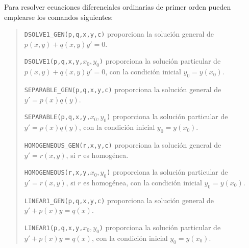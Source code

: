 \begin{indicacion}
{ Para resolver ecuaciones diferenciales ordinarias de primer orden
 pueden emplearse los
comandos siguientes:
\begin{quote}
\texttt{DSOLVE1\_GEN(p,q,x,y,c)} proporciona la solución general de $p(x,y)+q(x,y)y'=0$.

\texttt{DSOLVE1(p,q,x,y,$x_{0},y_{0}$)} proporciona la solución particular de $p(x,y)+q(x,y)y'=0$, con la condición inicial $y_{0}=y(x_{0})$.

\texttt{SEPARABLE\_GEN(p,q,x,y,c)} proporciona la solución general de $y'=p(x)q(y)$.

\texttt{SEPARABLE(p,q,x,y,$x_{0},y_{0}$)} proporciona la solución particular de $y'=p(x)q(y)$, con la condición inicial $y_{0}=y(x_{0})$.

\texttt{HOMOGENEOUS\_GEN(r,x,y,c)} proporciona la solución general de $y'=r(x,y)$, si $r$ es homogénea.

\texttt{HOMOGENEOUS(r,x,y,$x_{0},y_{0}$)} proporciona la solución particular de $y'=r(x,y)$, si $r$ es homogénea, con la condición inicial $y_{0}=y(x_{0})$.

\texttt{LINEAR1\_GEN(p,q,x,y,c)} proporciona la solución general de $y'+p(x)y = q(x)$.

\texttt{LINEAR1(p,q,x,y,$x_{0},y_{0}$)} proporciona la solución particular de $y'+p(x)y = q(x)$, con la condición inicial $y_{0}=y(x_{0})$.
\end{quote}
}
\end{indicacion}

